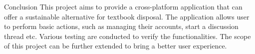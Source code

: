 \begin{block}{Conclusion}
    This project aims to provide a cross-platform application that can offer a sustainable alternative for textbook disposal. The application allows user to perform basic actions, such as managing their accounts, start a discussion thread etc. Various testing are conducted to verify the functionalities. The scope of this project can be further extended to bring a better user experience.
\end{block}
